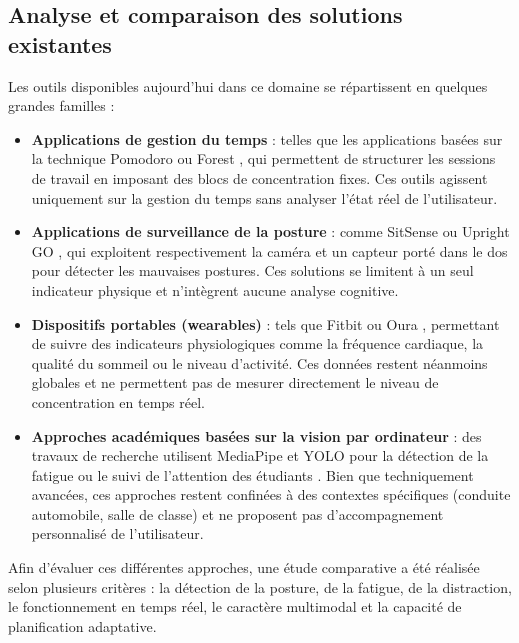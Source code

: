 \subsection{Analyse et comparaison des solutions existantes}

Les outils disponibles aujourd’hui dans ce domaine se répartissent en quelques grandes familles :

\begin{itemize}
    \item \textbf{Applications de gestion du temps} : telles que les applications basées sur la technique Pomodoro \cite{pomodoro} ou Forest \cite{forest}, qui permettent de structurer les sessions de travail en imposant des blocs de concentration fixes. Ces outils agissent uniquement sur la gestion du temps sans analyser l’état réel de l’utilisateur.

    \item \textbf{Applications de surveillance de la posture} : comme SitSense \cite{sitsense} ou Upright GO \cite{uprightgo}, qui exploitent respectivement la caméra et un capteur porté dans le dos pour détecter les mauvaises postures. Ces solutions se limitent à un seul indicateur physique et n’intègrent aucune analyse cognitive.

    \item \textbf{Dispositifs portables (wearables)} : tels que Fitbit \cite{fitbit} ou Oura \cite{oura}, permettant de suivre des indicateurs physiologiques comme la fréquence cardiaque, la qualité du sommeil ou le niveau d’activité. Ces données restent néanmoins globales et ne permettent pas de mesurer directement le niveau de concentration en temps réel.

    \item \textbf{Approches académiques basées sur la vision par ordinateur} : des travaux de recherche utilisent MediaPipe \cite{mediapipe} et YOLO \cite{yolo} pour la détection de la fatigue \cite{fatiguedetection} ou le suivi de l’attention des étudiants \cite{studentattention}. Bien que techniquement avancées, ces approches restent confinées à des contextes spécifiques (conduite automobile, salle de classe) et ne proposent pas d’accompagnement personnalisé de l’utilisateur.
\end{itemize}

Afin d’évaluer ces différentes approches, une étude comparative a été réalisée selon plusieurs critères : la détection de la posture, de la fatigue, de la distraction, le fonctionnement en temps réel, le caractère multimodal et la capacité de planification adaptative.

